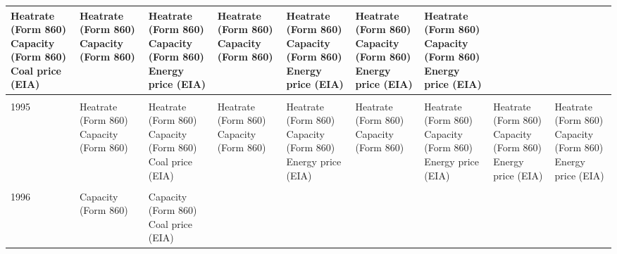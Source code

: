\documentclass[10pt]{report}
\begin{document}
\begin{scriptsize}
\begin{landscape}
\begin{center}
\begin{longtable}{|lllllllll|}
\shortstack{Heatrate (Form 860) \\ Capacity (Form 860) \\ Coal price (EIA)} &
\shortstack{Heatrate (Form 860) \\ Capacity (Form 860)} &
\shortstack{Heatrate (Form 860) \\ Capacity (Form 860) \\ Energy price (EIA)} &
\shortstack{Heatrate (Form 860) \\ Capacity (Form 860)} &
\shortstack{Heatrate (Form 860) \\ Capacity (Form 860) \\ Energy price (EIA)} &
\shortstack{Heatrate (Form 860) \\ Capacity (Form 860) \\ Energy price (EIA)} &
\shortstack{Heatrate (Form 860) \\ Capacity (Form 860) \\ Energy price (EIA)} \\
\hline \\
1995 & \shortstack{Heatrate (Form 860) \\ Capacity (Form 860)}  &
\shortstack{Heatrate (Form 860) \\ Capacity (Form 860) \\ Coal price (EIA)} &
\shortstack{Heatrate (Form 860) \\ Capacity (Form 860)} &
\shortstack{Heatrate (Form 860) \\ Capacity (Form 860) \\ Energy price (EIA)} &
\shortstack{Heatrate (Form 860) \\ Capacity (Form 860)} &
\shortstack{Heatrate (Form 860) \\ Capacity (Form 860) \\ Energy price (EIA)} &
\shortstack{Heatrate (Form 860) \\ Capacity (Form 860) \\ Energy price (EIA)} &
\shortstack{Heatrate (Form 860) \\ Capacity (Form 860) \\ Energy price (EIA)}\\
\hline \\
1996 & Capacity (Form 860) &
\shortstack{Capacity (Form 860) \\ Coal price (EIA)} &

\end{longtable}
\end{center}
\end{landscape}
\end{scriptsize}
\end{document}
